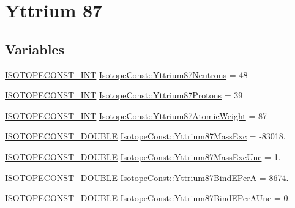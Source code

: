 \hypertarget{group___isotope_const-_yttrium-_y87}{}\section{Yttrium 87}
\label{group___isotope_const-_yttrium-_y87}
\subsection*{Variables}
\begin{DoxyCompactItemize}
\item 
\mbox{\hyperlink{group___isotope_const-_macros_ga5f18360b3e99483a35c32d789e62621c}{I\+S\+O\+T\+O\+P\+E\+C\+O\+N\+S\+T\+\_\+\+I\+NT}} \mbox{\hyperlink{group___isotope_const-_yttrium-_y87_ga4b79c914608779c208103b477aa1ef7c}{Isotope\+Const\+::\+Yttrium87\+Neutrons}} = 48
\item 
\mbox{\hyperlink{group___isotope_const-_macros_ga5f18360b3e99483a35c32d789e62621c}{I\+S\+O\+T\+O\+P\+E\+C\+O\+N\+S\+T\+\_\+\+I\+NT}} \mbox{\hyperlink{group___isotope_const-_yttrium-_y87_gaa271591e1ea0447a5c086b34a7d5fe26}{Isotope\+Const\+::\+Yttrium87\+Protons}} = 39
\item 
\mbox{\hyperlink{group___isotope_const-_macros_ga5f18360b3e99483a35c32d789e62621c}{I\+S\+O\+T\+O\+P\+E\+C\+O\+N\+S\+T\+\_\+\+I\+NT}} \mbox{\hyperlink{group___isotope_const-_yttrium-_y87_ga56ae6c99eee91d45bb20532ae1a04649}{Isotope\+Const\+::\+Yttrium87\+Atomic\+Weight}} = 87
\item 
\mbox{\hyperlink{group___isotope_const-_macros_ga8f45a7272ce02c0b4c65c44636ed719a}{I\+S\+O\+T\+O\+P\+E\+C\+O\+N\+S\+T\+\_\+\+D\+O\+U\+B\+LE}} \mbox{\hyperlink{group___isotope_const-_yttrium-_y87_gace25ff7e69ac89512ded47d88c533e2d}{Isotope\+Const\+::\+Yttrium87\+Mass\+Exc}} = -\/83018.
\item 
\mbox{\hyperlink{group___isotope_const-_macros_ga8f45a7272ce02c0b4c65c44636ed719a}{I\+S\+O\+T\+O\+P\+E\+C\+O\+N\+S\+T\+\_\+\+D\+O\+U\+B\+LE}} \mbox{\hyperlink{group___isotope_const-_yttrium-_y87_gab3e79548bb84c2787743417028ed5b22}{Isotope\+Const\+::\+Yttrium87\+Mass\+Exc\+Unc}} = 1.
\item 
\mbox{\hyperlink{group___isotope_const-_macros_ga8f45a7272ce02c0b4c65c44636ed719a}{I\+S\+O\+T\+O\+P\+E\+C\+O\+N\+S\+T\+\_\+\+D\+O\+U\+B\+LE}} \mbox{\hyperlink{group___isotope_const-_yttrium-_y87_ga92e50577ac3ea62aaa27ec255158362a}{Isotope\+Const\+::\+Yttrium87\+Bind\+E\+PerA}} = 8674.
\item 
\mbox{\hyperlink{group___isotope_const-_macros_ga8f45a7272ce02c0b4c65c44636ed719a}{I\+S\+O\+T\+O\+P\+E\+C\+O\+N\+S\+T\+\_\+\+D\+O\+U\+B\+LE}} \mbox{\hyperlink{group___isotope_const-_yttrium-_y87_ga1e419cb7375590713cd84d07e1924bbd}{Isotope\+Const\+::\+Yttrium87\+Bind\+E\+Per\+A\+Unc}} = 0.

\end{DoxyCompactItemize}

